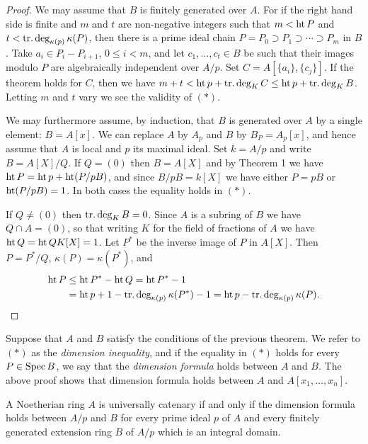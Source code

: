 \begin{proof}
We may assume that $B$ is finitely generated over $A$. For if the right
hand side is finite and $m$ and $t$ are non-negative integers such that $m < \operatorname{ht} P$
and $t < \operatorname{tr.deg}_{\kappa(p)}\kappa(P)$, then there is a prime ideal chain
$P = P_0 \supset P_1 \supset \cdots \supset P_m$ in $B$. Take $a_i \in P_i - P_{i+1}$, $0 \le i < m$, and let
$c_1, \ldots, c_t \in B$ be such that their images modulo $P$ are algebraically
independent over $A/p$. Set $C = A[\{a_i\}, \{c_j\}]$. If the theorem holds for $C$,
then we have $m + t < \operatorname{ht} p + \operatorname{tr.deg}_K C \le \operatorname{ht} p + \operatorname{tr.deg}_K B$. Letting $m$ and $t$ vary
we see the validity of $(*)$.

We may furthermore assume, by induction, that $B$ is generated over $A$ by
a single element: $B = A[x]$. We can replace $A$ by $A_p$ and $B$ by $B_P = A_p[x]$,
and hence assume that $A$ is local and $p$ its maximal ideal. Set $k = A/p$ and
write $B = A[X]/Q$. If $Q = (0)$ then $B = A[X]$ and by Theorem 1 we have
$\operatorname{ht} P = \operatorname{ht} p + \operatorname{ht}(P/pB)$, and since $B/pB = k[X]$ we have either $P = pB$ or
$\operatorname{ht}(P/pB) = 1$. In both cases the equality holds in $(*)$.

If $Q \neq (0)$ then $\operatorname{tr.deg}_K B = 0$. Since $A$ is a subring of $B$ we have
$Q \cap A = (0)$, so that writing $K$ for the field of fractions of $A$ we have
$\operatorname{ht} Q = \operatorname{ht} QK[X] = 1$. Let $P^*$ be the inverse image of $P$ in $A[X]$. Then
$P = P^*/Q$, $\kappa(P) = \kappa(P^*)$, and
\begin{align*}
  \operatorname{ht} P &\le \operatorname{ht} P^* - \operatorname{ht} Q = \operatorname{ht} P^* - 1 \\
          &= \operatorname{ht} p + 1 - \operatorname{tr.deg}_{\kappa(p)}\kappa(P^*) - 1 = \operatorname{ht} p - \operatorname{tr.deg}_{\kappa(p)}\kappa(P).
\end{align*}
\end{proof}

\begin{definition}
Suppose that $A$ and $B$ satisfy the conditions of the previous
theorem. We refer to $(*)$ as the \emph{dimension inequality}, and if the equality in $(*)$
holds for every $P \in \operatorname{Spec} B$, we say that the \emph{dimension formula} holds between
$A$ and $B$. The above proof shows that dimension formula holds between $A$
and $A[x_1, \ldots, x_n]$.
\end{definition}

\begin{theorem}[Ratliff]\label{thm:15.6}
A Noetherian ring $A$ is universally catenary if and
only if the dimension formula holds between $A/p$ and $B$ for every prime
ideal $p$ of $A$ and every finitely generated extension ring $B$ of $A/p$ which
is an integral domain.
\end{theorem}

